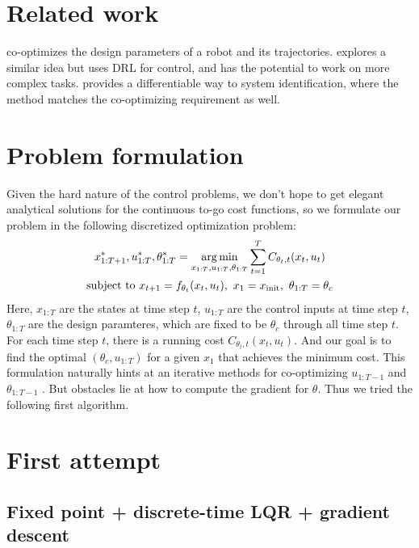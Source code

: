 \documentclass[conference]{IEEEtran}
\begin{document}
\section{Related work}



\cite{spielberg2017functional} co-optimizes the design parameters of a robot and its trajectories.
\cite{ha2019reinforcement} explores a similar idea but uses DRL for control, and has the potential to work on more complex tasks.
\cite{amos2018differentiable} provides a differentiable way to system identification, where the method matches the co-optimizing requirement as well.


\section{Problem formulation}

Given the hard nature of the control problems, we don't hope to get elegant analytical solutions for the continuous to-go cost functions, so we formulate our problem in the following discretized optimization problem:
\begin{gather*}
x_{1:T+1}^*, u_{1:T}^*, \theta_{1:T}^* = \operatorname*{arg\,min}\limits_{x_{1:T},u_{1:T},\theta_{1:T}}  \sum\limits_{t=1}^{T}  C_{\theta_t,t}(x_t,u_t) \\
\text{subject to~} x_{t+1} = f_{\theta_t}(x_t,u_t),~x_1 = x_{\text{init}},~\theta_{1:T} = \theta_c
\end{gather*}
Here, $x_{1:T}$ are the states at time step $t$, $u_{1:T}$ are the control inputs at time step $t$, $\theta_{1:T}$ are the design paramteres, which are fixed to be $\theta_c$ through all time step $t$. For each time step $t$, there is a running cost $C_{\theta_t,t}(x_t,u_t)$. And our goal is to find the optimal $(\theta_c, u_{1:T})$ for a given $x_1$ that achieves the minimum cost. This formulation naturally hints at an iterative methods for co-optimizing $u_{1:T-1}$ and $\theta_{1:T-1}$ . But obstacles lie at how to compute the gradient for $\theta$. Thus we tried the following first algorithm.


\section{First attempt}

\subsection{Fixed point + discrete-time LQR + gradient descent}
\end{document}
